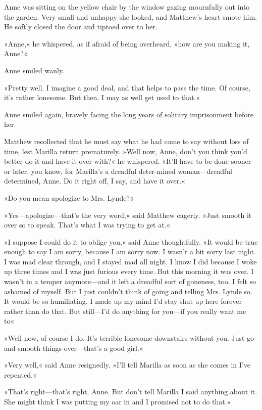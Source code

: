 Anne was sitting on the yellow chair by the window gazing mournfully out into the garden. Very small and unhappy she looked, and Matthew's heart smote him. He softly closed the door and tiptoed over to her.

»Anne,« he whispered, as if afraid of being overheard, »how are you making it, Anne?«

Anne smiled wanly.

»Pretty well. I imagine a good deal, and that helps to pass the time. Of course, it's rather lonesome. But then, I may as well get used to that.«

Anne smiled again, bravely facing the long years of solitary imprisonment before her.

Matthew recollected that he must say what he had come to say without loss of time, lest Marilla return prematurely. »Well now, Anne, don't you think you'd better do it and have it over with?« he whispered. »It'll have to be done sooner or later, you know, for Marilla's a dreadful deter-mined woman—dreadful determined, Anne. Do it right off, I say, and have it over.«

»Do you mean apologize to Mrs. Lynde?«

»Yes—apologize—that's the very word,« said Matthew eagerly. »Just smooth it over so to speak. That's what I was trying to get at.«

»I suppose I could do it to oblige you,« said Anne thoughtfully. »It would be true enough to say I am sorry, because I am sorry now. I wasn't a bit sorry last night. I was mad clear through, and I stayed mad all night. I know I did because I woke up three times and I was just furious every time. But this morning it was over. I wasn't in a temper anymore—and it left a dreadful sort of goneness, too. I felt so ashamed of myself. But I just couldn't think of going and telling Mrs. Lynde so. It would be so humiliating. I made up my mind I'd stay shut up here forever rather than do that. But still—I'd do anything for you—if you really want me to\longdash«

»Well now, of course I do. It's terrible lonesome downstairs without you. Just go and smooth things over—that's a good girl.«

»Very well,« said Anne resignedly. »I'll tell Marilla as soon as she comes in I've repented.«

»That's right—that's right, Anne. But don't tell Marilla I said anything about it. She might think I was putting my oar in and I promised not to do that.«

